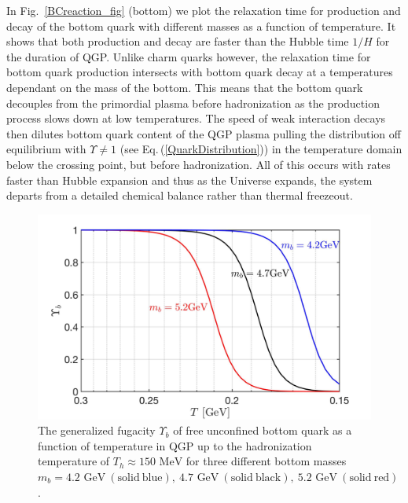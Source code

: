\documentclass[universe,article,submit,moreauthors,pdftex,a4paper]{Definitions/mdpi}
\newcommand{\GeV}{\text{ GeV}}
\newcommand{\MeV}{\text{ MeV}}
\newcommand{\req}[1]{Eq.\,(\ref{#1})}
\newcommand*{\rf}[1]{Fig.~{\ref{#1}}}
\begin{document}
In \rf{BCreaction_fig} (bottom) we plot the relaxation time for production and decay of the bottom quark with different masses as a function of temperature. It shows that both production and decay are faster than the Hubble time $1/H$ for the duration of QGP. Unlike charm quarks however, the relaxation time for bottom quark production intersects with bottom quark decay at a temperatures dependant on the mass of the bottom. This means that the bottom quark decouples from the primordial plasma before hadronization as the production process slows down at low temperatures. The speed of weak interaction decays then dilutes bottom quark content of the QGP plasma pulling the distribution off equilibrium with $\Upsilon\neq1$ (see \req{QuarkDistribution}) in the temperature domain below the crossing point, but before hadronization. All of this occurs with rates faster than Hubble expansion and thus as the Universe expands, the system departs from a detailed chemical balance rather than thermal freezeout.
\begin{figure}[t]
\centering
\includegraphics[width=\textwidth]{./plots/BquarkFugacity.jpg}
\caption{The generalized fugacity $\Upsilon_{b}$ of free unconfined bottom quark as a function of temperature in QGP up to the hadronization temperature of $T_{h}\approx150\MeV$ for three different bottom masses $m_{b}={4.2\GeV\ \mathrm{(solid\ blue)},\ 4.7\GeV\ \mathrm{(solid\ black)},\ 5.2\GeV\ \mathrm{(solid\ red)}}$.}
\label{UpsilonBottom_fig}
\end{figure}
\end{document}
